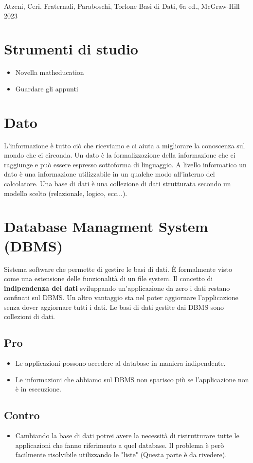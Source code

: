 \documentclass{article}
\begin{document}
Atzeni, Ceri. Fraternali, Paraboschi, Torlone Basi di Dati, 6a ed., McGraw-Hill 2023

\section{Strumenti di studio}
\begin{itemize}
  \item Novella matheducation
  \item Guardare gli appunti
\end{itemize}

\section{Dato}
L'informazione è tutto ciò che riceviamo e ci aiuta a migliorare la conoscenza sul mondo che ci circonda. Un dato è la formalizzazione della informazione che ci raggiunge e può essere espresso sottoforma di linguaggio. A livello informatico un dato è una informazione utilizzabile in un qualche modo all'interno del calcolatore. Una base di dati è una collezione di dati strutturata secondo un modello scelto (relazionale, logico, ecc...).

\section{Database Managment System (DBMS)}
Sistema software che permette di gestire le basi di dati. È formalmente visto come una estensione delle funzionalità di un file system. Il concetto di \textbf{indipendenza dei dati} sviluppando un'applicazione da zero i dati restano confinati sul DBMS. Un altro vantaggio sta nel poter aggiornare l'applicazione senza dover aggiornare tutti i dati. Le basi di dati gestite dai DBMS sono collezioni di dati.

\subsection{Pro}
\begin{itemize}
  \item Le applicazioni possono accedere al database in maniera indipendente.
  \item Le informazioni che abbiamo sul DBMS non sparisco più se l'applicazione non è in esecuzione.
\end{itemize}

\subsection{Contro}
\begin{itemize}
  \item Cambiando la base di dati potrei avere la necessità di ristrutturare tutte le applicazioni che fanno riferimento a quel database. Il problema è però facilmente risolvibile utilizzando le "liste" (Questa parte è da rivedere).
\end{itemize}
\end{document}
